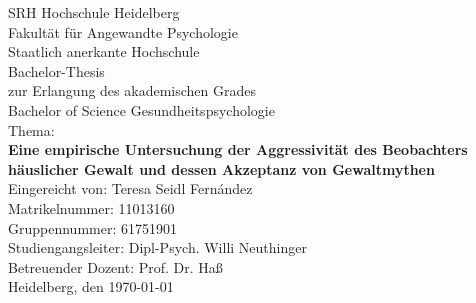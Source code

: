 \begin{titlepage}
\begin{center}

\thispagestyle{empty} 

    SRH Hochschule Heidelberg\\
    Fakultät für Angewandte Psychologie\\
    Staatlich anerkante Hochschule\\[3cm]
    
    Bachelor-Thesis\\   
    zur Erlangung des akademischen Grades\\
    Bachelor of Science Gesundheitspsychologie\\[1.5cm]

    Thema:\\
    {\bf Eine empirische Untersuchung der Aggressivität des Beobachters häuslicher Gewalt
    und dessen Akzeptanz von Gewaltmythen} \\[2cm]  

    Eingereicht von: Teresa Seidl Fern\'andez\\    %
    Matrikelnummer: 11013160\\                     %
    Gruppennummer: 61751901\\[2.5cm]               %

    Studiengangsleiter: Dipl-Psych. Willi Neuthinger\\
    Betreuender Dozent: Prof. Dr. Haß\\[1cm]       %

    Heidelberg, den \today

\end{center}
\end{titlepage}